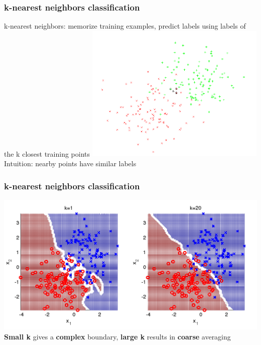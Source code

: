 \begin{frame}
  \frametitle{k-nearest neighbors classification}

  \begin{center}
    k-nearest neighbors: memorize training examples, predict labels using labels of the k closest training points
    \vskip20pt
    \includegraphics[width=0.65\textwidth]{knn_schematic.png}
    \vskip10pt
    Intuition: nearby points have similar labels
  \end{center}

\end{frame}


\begin{frame}
  \frametitle{k-nearest neighbors classification}

  \begin{center}
    \includegraphics[width=\textwidth]{knn_boundary.png}
    \vskip10pt
    \textbf{Small k} gives a \textbf{complex} boundary, \textbf{large
      k} results in \textbf{coarse} averaging
  \end{center}

\end{frame}

